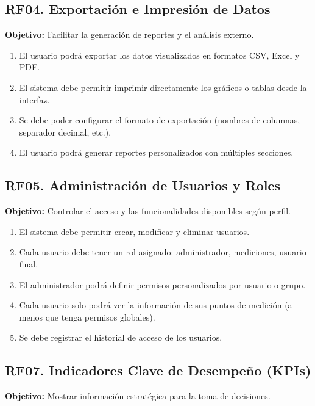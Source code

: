 \documentclass[12pt,a4paper]{article}
\begin{document}
\subsection{RF04. Exportación e Impresión de Datos}

\textbf{Objetivo:} Facilitar la generación de reportes y el análisis externo.

\begin{enumerate}[label=RF04.\arabic*]
    \item El usuario podrá exportar los datos visualizados en formatos CSV, Excel y PDF.
    \item El sistema debe permitir imprimir directamente los gráficos o tablas desde la interfaz.
    \item Se debe poder configurar el formato de exportación (nombres de columnas, separador decimal, etc.).
    \item El usuario podrá generar reportes personalizados con múltiples secciones.
\end{enumerate}

\subsection{RF05. Administración de Usuarios y Roles}

\textbf{Objetivo:} Controlar el acceso y las funcionalidades disponibles según perfil.

\begin{enumerate}[label=RF05.\arabic*]
    \item El sistema debe permitir crear, modificar y eliminar usuarios.
    \item Cada usuario debe tener un rol asignado: administrador, mediciones, usuario final.
    \item El administrador podrá definir permisos personalizados por usuario o grupo.
    \item Cada usuario solo podrá ver la información de sus puntos de medición (a menos que tenga permisos globales).
    \item Se debe registrar el historial de acceso de los usuarios.
\end{enumerate}

\subsection{RF07. Indicadores Clave de Desempeño (KPIs)}

\textbf{Objetivo:} Mostrar información estratégica para la toma de decisiones.
\end{document}
